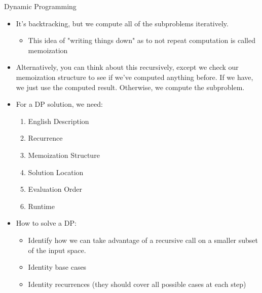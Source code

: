 \documentclass{beamer}
\begin{document}
\begin{frame}[t]{Dynamic Programming}
  \begin{itemize}
      \item It's backtracking, but we compute all of the subproblems iteratively.
      \begin{itemize}
          \item This idea of "writing things down" as to not repeat computation is called \alert{memoization} 
      \end{itemize}   
      \pause
      \item Alternatively, you can think about this recursively, except we check our memoization structure to see if we've computed anything before. If we have, we just use the computed result. Otherwise, we compute the subproblem.
      \pause
      \item For a DP solution, we need:
      \begin{enumerate}
            \item English Description
            \item Recurrence
            \item Memoization Structure
            \item Solution Location
            \item Evaluation Order
            \item Runtime
      \end{enumerate}
      \pause
      \item \alert{How to solve a DP:}
      \begin{itemize}
          \item Identify how we can take advantage of a recursive call on a smaller subset of the input space.
          \item Identity base cases
          \item Identity recurrences (they should cover all possible cases at each step)
      \end{itemize}
  \end{itemize}
\end{frame}
\end{document}
